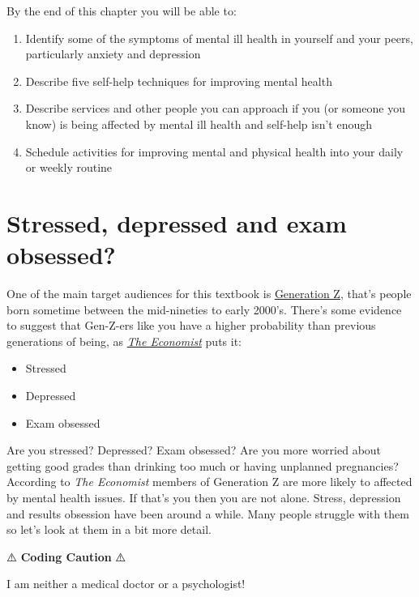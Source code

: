 \documentclass[
]{book}
\providecommand{\tightlist}{%
  \setlength{\itemsep}{0pt}\setlength{\parskip}{0pt}}
\begin{document}
By the end of this chapter you will be able to:

\begin{enumerate}
\def\labelenumi{\arabic{enumi}.}
\tightlist
\item
  Identify some of the symptoms of mental ill health in yourself and your peers, particularly anxiety and depression
\item
  Describe five self-help techniques for improving mental health
\item
  Describe services and other people you can approach if you (or someone you know) is being affected by mental ill health and self-help isn't enough
\item
  Schedule activities for improving mental and physical health into your daily or weekly routine
\end{enumerate}

\hypertarget{genz}{%
\section{Stressed, depressed and exam obsessed?}\label{genz}}

One of the main target audiences for this textbook is \href{https://en.wikipedia.org/wiki/Generation_Z}{Generation Z}, that's people born sometime between the mid-nineties to early 2000's. There's some evidence to suggest that Gen-Z-ers like you have a higher probability than previous generations of being, as \emph{\href{https://en.wikipedia.org/wiki/The_Economist}{The Economist}} puts it:

\begin{itemize}
\tightlist
\item
  Stressed
\item
  Depressed
\item
  Exam obsessed
\end{itemize}

Are you stressed? Depressed? Exam obsessed? Are you more worried about getting good grades than drinking too much or having unplanned pregnancies? According to \emph{The Economist} members of Generation Z are more likely to affected by mental health issues. \citep{generationz} If that's you then you are not alone. Stress, depression and results obsession have been around a while. Many people struggle with them so let's look at them in a bit more detail.

⚠️ \textbf{Coding Caution} ⚠️

I am neither a medical doctor or a psychologist!
\end{document}
